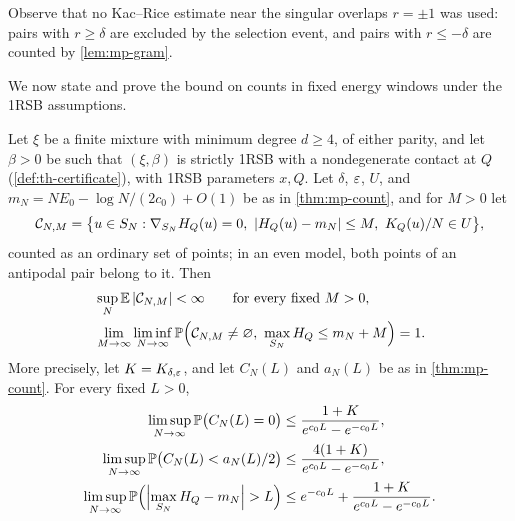 Observe that no Kac--Rice estimate near the singular overlaps $r=\pm1$ was used: pairs with $r\ge\delta$ are excluded by the selection event, and pairs with $r\le-\delta$ are counted by \cref{lem:mp-gram}.

We now state and prove the bound on counts in fixed energy windows under the 1RSB assumptions.

\begin{theorem}\label{thm:mc-counts}
Let $\xi$ be a finite mixture with minimum degree $d\ge4$, of either parity, and let $\beta>0$ be such that $(\xi,\beta)$ is strictly 1RSB with a nondegenerate contact at $Q$ (\cref{def:th-certificate}), with 1RSB parameters $x,Q$. Let $\delta$, $\varepsilon$, $U$, and $m_N=NE_0-\log N/(2c_0)+O(1)$ be as in \cref{thm:mp-count}, and for $M>0$ let
\[
\mathcal C_{N,M}=\bigl\{u\in S_N:\nabla_{S_N}H_Q(u)=0,\ \left|H_Q(u)-m_N\right|\le M,\ K_Q(u)/N\in U\bigr\},
\]
counted as an ordinary set of points; in an even model, both points of an antipodal pair belong to it. Then
\begin{align}
&\sup_N\E\abs{\cC_{N,M}}<\infty\qquad\text{for every fixed }M>0,\label{eq:mp-I3-count}\\
&\lim_{M\to\infty}\liminf_{N\to\infty}\Pp\Bigl(\cC_{N,M}\ne\varnothing,\ \max_{S_N}H_Q\le m_N+M\Bigr)=1.\label{eq:mp-I3-ground}
\end{align}
More precisely, let $K=K_{\delta,\varepsilon}$, and let $C_N(L)$ and $a_N(L)$ be as in \cref{thm:mp-count}. For every fixed $L>0$,
\begin{align}
\limsup_{N\to\infty}\Pp\bigl(C_N(L)=0\bigr)&\le\frac{1+K}{e^{c_0L}-e^{-c_0L}},\label{eq:mp-existence}\\
\limsup_{N\to\infty}\Pp\bigl(C_N(L)<a_N(L)/2\bigr)&\le\frac{4(1+K)}{e^{c_0L}-e^{-c_0L}},\label{eq:mp-many}\\
\limsup_{N\to\infty}\Pp\Bigl(\Bigl|\max_{S_N}H_Q-m_N\Bigr|>L\Bigr)&\le e^{-c_0L}+\frac{1+K}{e^{c_0L}-e^{-c_0L}}.\label{eq:mp-tight}
\end{align}
\end{theorem}

